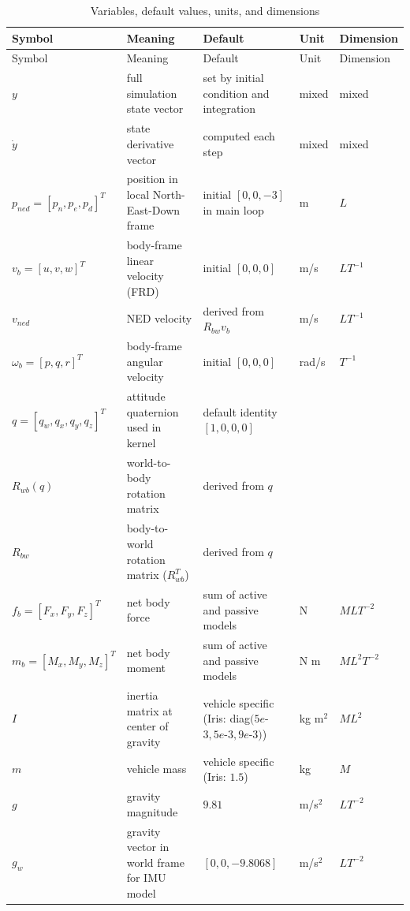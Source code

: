 \documentclass[11pt,a4paper]{article}
\begin{document}
\footnotesize
\renewcommand{\arraystretch}{1.12}
\begin{longtable}{>{\raggedright\arraybackslash}p{} >{\raggedright\arraybackslash}p{} >{\raggedright\arraybackslash}p{} >{\raggedright\arraybackslash}p{} >{\raggedright\arraybackslash}p{}}
\caption{Variables, default values, units, and dimensions}\label{tab:variables}\\
\toprule
Symbol & Meaning & Default & Unit & Dimension \\
\midrule
\endfirsthead
\toprule
Symbol & Meaning & Default & Unit & Dimension \\
\midrule
\endhead
$y$ & full simulation state vector & set by initial condition and integration & mixed & mixed \\
$\dot{y}$ & state derivative vector & computed each step & mixed & mixed \\
$p_{ned}=[p_n,p_e,p_d]^T$ & position in local North-East-Down frame & initial $[0,0,-3]$ in main loop & m & $L$ \\
$v_b=[u,v,w]^T$ & body-frame linear velocity (FRD) & initial $[0,0,0]$ & m/s & $LT^{-1}$ \\
$v_{ned}$ & NED velocity & derived from $R_{bw}v_b$ & m/s & $LT^{-1}$ \\
$\omega_b=[p,q,r]^T$ & body-frame angular velocity & initial $[0,0,0]$ & rad/s & $T^{-1}$ \\
$q=[q_w,q_x,q_y,q_z]^T$ & attitude quaternion used in kernel & default identity $[1,0,0,0]$ & 1 & 1 \\
$R_{wb}(q)$ & world-to-body rotation matrix & derived from $q$ & 1 & 1 \\
$R_{bw}$ & body-to-world rotation matrix ($R_{wb}^T$) & derived from $q$ & 1 & 1 \\
$f_b=[F_x,F_y,F_z]^T$ & net body force & sum of active and passive models & N & $MLT^{-2}$ \\
$m_b=[M_x,M_y,M_z]^T$ & net body moment & sum of active and passive models & N m & $ML^2T^{-2}$ \\
$I$ & inertia matrix at center of gravity & vehicle specific (Iris: diag$(5e$-$3,5e$-$3,9e$-$3)$) & kg m$^2$ & $ML^2$ \\
$m$ & vehicle mass & vehicle specific (Iris: $1.5$) & kg & $M$ \\
$g$ & gravity magnitude & $9.81$ & m/s$^2$ & $LT^{-2}$ \\
$g_w$ & gravity vector in world frame for IMU model & $[0,0,-9.8068]$ & m/s$^2$ & $LT^{-2}$ \\

\end{longtable}
\end{document}
